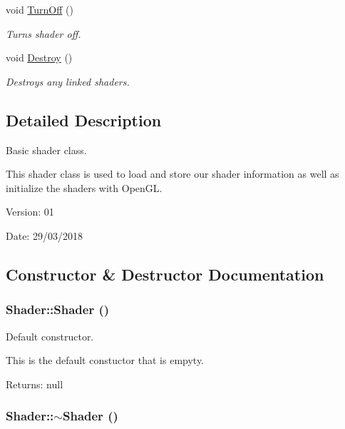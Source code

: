 \begin{CompactItemize}
void \hyperlink{class_shader_d94b005141a4ed31a3f4f801455e5590}{TurnOff} ()
\begin{CompactList}\small\item\em Turns shader off. \item\end{CompactList}\item 
void \hyperlink{class_shader_b6fc1a824cb122fcb0c902397e20f72f}{Destroy} ()
\begin{CompactList}\small\item\em Destroys any linked shaders. \item\end{CompactList}\end{CompactItemize}


\subsection{Detailed Description}
Basic shader class. 

This shader class is used to load and store our shader information as well as initialize the shaders with OpenGL.

\begin{Desc}
\item[Version:]01 \end{Desc}
\begin{Desc}
\item[Date:]29/03/2018 \end{Desc}


\subsection{Constructor \& Destructor Documentation}
\hypertarget{class_shader_0d654ebaca4e0555197c0724c6d30610}{
\subsubsection[Shader]{\setlength{\rightskip}{0pt plus 5cm}Shader::Shader ()}}
\label{class_shader_0d654ebaca4e0555197c0724c6d30610}


Default constructor. 

This is the default constuctor that is empyty.

\begin{Desc}
\item[Returns:]null \end{Desc}
\hypertarget{class_shader_ff01df87e8a102f270b5b135a295e59d}{
\subsubsection[$\sim$Shader]{\setlength{\rightskip}{0pt plus 5cm}Shader::$\sim$Shader ()}}
\label{class_shader_ff01df87e8a102f270b5b135a295e59d}


